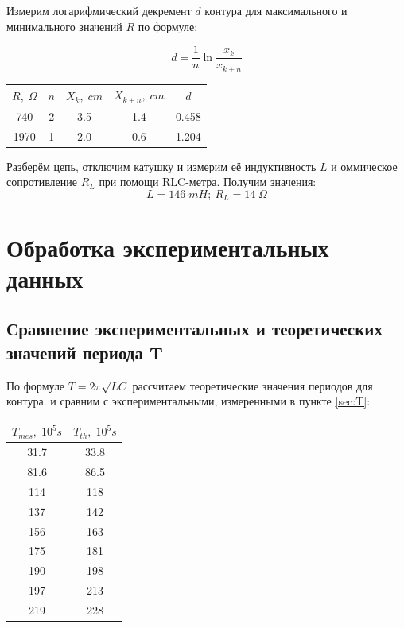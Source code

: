 \documentclass{article}
\begin{document}
Измерим логарифмический декремент \(d\) контура для максимального и минимального значений \(R\) по формуле:

\[ d = \frac{1}{n}\ln\frac{x_k}{x_{k+n}} \]

\begin{table}[H]
    \centering
    \begin{tabular}{|c|c|c|c|c|}
        \hline
    \(R,\; \Omega\) & \(n\) & \(X_k,\; cm\) & \(X_{k+n},\; cm\) & \(d\) \\\hline
    740  & 2 & 3.5 & 1.4 & 0.458 \\\hline
    1970 & 1 & 2.0 & 0.6 & 1.204 \\\hline
    \end{tabular}
\end{table}

Разберём цепь, отключим катушку и измерим её индуктивность \(L\) и оммическое сопротивление \(R_L\) при помощи
RLC-метра. Получим значения:
\[ L = 146\; mH;\: R_L = 14\;\Omega \]

\section{Обработка экспериментальных данных}
\subsection{Сравнение экспериментальных и теоретических значений периода T} \label{sec:T-T}

По формуле \( T = 2\pi\sqrt{LC} \) рассчитаем теоретические значения периодов для контура. и сравним с экспериментальными,
измеренными в пункте \ref{sec:T}:

\begin{table}[H]
    \centering
    \begin{tabular}{|c|c|}
        \hline
        \(T_{mes},\; 10^5 s\) & \(T_{th},\; 10^5s\) \\\hline
        31.7    & 33.8 \\\hline
        81.6    & 86.5 \\\hline
        114	    & 118  \\\hline
        137	    & 142  \\\hline
        156	    & 163  \\\hline
        175	    & 181  \\\hline
        190	    & 198  \\\hline
        197	    & 213  \\\hline
        219	    & 228  \\\hline
    \end{tabular}
\end{table}
\end{document}
